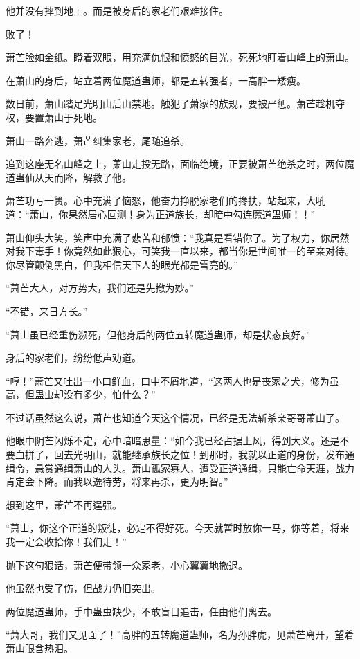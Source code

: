 \begin{this_body}
他并没有摔到地上。而是被身后的家老们艰难接住。

败了！

萧芒脸如金纸。瞪着双眼，用充满仇恨和愤怒的目光，死死地盯着山峰上的萧山。

在萧山的身后，站立着两位魔道蛊师，都是五转强者，一高胖一矮瘦。

数日前，萧山踏足光明山后山禁地。触犯了萧家的族规，要被严惩。萧芒趁机夺权，要置萧山于死地。

萧山一路奔逃，萧芒纠集家老，尾随追杀。

追到这座无名山峰之上，萧山走投无路，面临绝境，正要被萧芒绝杀之时，两位魔道蛊仙从天而降，解救了他。

萧芒功亏一篑。心中充满了恼怒，他奋力挣脱家老们的搀扶，站起来，大吼道：“萧山，你果然居心叵测！身为正道族长，却暗中勾连魔道蛊师！！”

萧山仰头大笑，笑声中充满了悲苦和郁愤：“我真是看错你了。为了权力，你居然对我下毒手！你竟然如此狠心，可笑我一直以来，都当你是世间唯一的至亲对待。你尽管颠倒黑白，但我相信天下人的眼光都是雪亮的。”

“萧芒大人，对方势大，我们还是先撤为妙。”

“不错，来日方长。”

“萧山虽已经重伤濒死，但他身后的两位五转魔道蛊师，却是状态良好。”

身后的家老们，纷纷低声劝道。

“哼！”萧芒又吐出一小口鲜血，口中不屑地道，“这两人也是丧家之犬，修为虽高，但蛊虫却没有多少，怕什么？”

不过话虽然这么说，萧芒也知道今天这个情况，已经是无法斩杀亲哥哥萧山了。

他眼中阴芒闪烁不定，心中暗暗思量：“如今我已经占据上风，得到大义。还是不要血拼了，回去光明山，就能继承族长之位！到那时，我就以正道的身份，发布通缉令，悬赏通缉萧山的人头。萧山孤家寡人，遭受正道通缉，只能亡命天涯，战力肯定会下降。而我以逸待劳，将来再杀，更为明智。”

想到这里，萧芒不再逞强。

“萧山，你这个正道的叛徒，必定不得好死。今天就暂时放你一马，你等着，将来我一定会收拾你！我们走！”

抛下这句狠话，萧芒便带领一众家老，小心翼翼地撤退。

他虽然也受了伤，但战力仍旧突出。

两位魔道蛊师，手中蛊虫缺少，不敢盲目追击，任由他们离去。

“萧大哥，我们又见面了！”高胖的五转魔道蛊师，名为孙胖虎，见萧芒离开，望着萧山眼含热泪。


\end{this_body}
